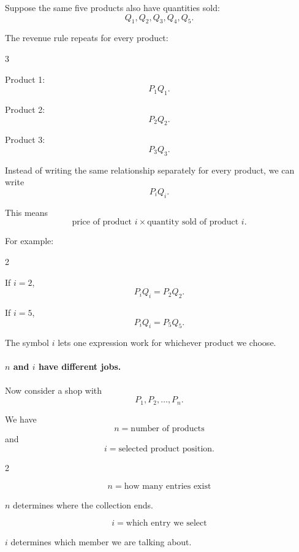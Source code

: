 	Suppose the same five products also have quantities sold:
	\[
	Q_1,Q_2,Q_3,Q_4,Q_5.
	\]
	
	The revenue rule repeats for every product:
	
	{
		\setlength{\columnseprule}{0.4pt}
		\setlength{\columnsep}{1.5em}
		\begin{multicols}{3}
			
			Product 1:
			\[
			P_1Q_1.
			\]
			
			\columnbreak
			
			Product 2:
			\[
			P_2Q_2.
			\]
			
			\columnbreak
			
			Product 3:
			\[
			P_3Q_3.
			\]
			
		\end{multicols}
	}
	
	Instead of writing the same relationship separately for every product, we can write
	\[
	P_iQ_i.
	\]
	
	This means
	\[
	\text{price of product }i
	\times
	\text{quantity sold of product }i.
	\]
	
	For example:
	
	{
		\setlength{\columnseprule}{0.4pt}
		\setlength{\columnsep}{1.5em}
		\begin{multicols}{2}
			
			If $i=2$,
			\[
			P_iQ_i=P_2Q_2.
			\]
			
			\columnbreak
			
			If $i=5$,
			\[
			P_iQ_i=P_5Q_5.
			\]
			
		\end{multicols}
	}
	
	The symbol $i$ lets one expression work for whichever product we choose.
	
	\paragraph{$n$ and $i$ have different jobs.}
	
	Now consider a shop with
	\[
	P_1,P_2,\ldots,P_n.
	\]
	
	We have
	\[
	n=\text{number of products}
	\]
	and
	\[
	i=\text{selected product position}.
	\]
	
	{
		\setlength{\columnseprule}{0.4pt}
		\setlength{\columnsep}{1.5em}
		\begin{multicols}{2}
			
			\[
			\boxed{n=\text{how many entries exist}}
			\]
			
			$n$ determines where the collection ends.
			
			\columnbreak
			
			\[
			\boxed{i=\text{which entry we select}}
			\]
			
			$i$ determines which member we are talking about.
			
		\end{multicols}
	}
	
